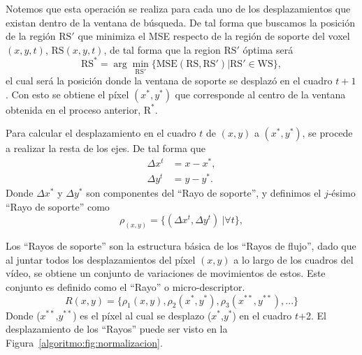 	Notemos que esta operación se realiza para cada uno de los desplazamientos que existan dentro de la ventana de búsqueda. De tal forma que buscamos la posición de la región $\text{RS}'$ que minimiza el MSE respecto de la región de soporte del voxel $(x,y,t)$, $\text{RS}(x,y,t)$, de tal forma que la region $\text{RS}'$ óptima será
	\begin{equation}
		\text{RS}^* = \arg \min_{\text{RS}'}\{\text{MSE}(\text{RS},\text{RS}') | \text{RS}' \in \text{WS} \},
	\end{equation}		
	el cual será la posición donde la ventana de soporte se desplazó en el cuadro $t+1$. Con esto se obtiene el píxel $(x^*,y^*)$ que corresponde al centro de la ventana obtenida en el proceso anterior, $\text{R}^*$.
	
	Para calcular el desplazamiento en el cuadro $t$ de $(x,y)$ a $(x^*,y^*)$, se procede a realizar la resta de los ejes. De tal forma que
	\begin{align}
		\Delta x^{t} &= x-x^*,\\ 
		\Delta y^{t} &= y-y^*.
	\end{align}
		Donde $ \Delta x^*$ y $ \Delta y^*$ son componentes del ``Rayo de soporte'', y definimos el $j$-ésimo ``Rayo de soporte'' como
	\begin{equation}
		\rho_{(x,y)} = \{(\Delta x^{t}, \Delta y^{t})~| \forall t\},
	\end{equation}		
	
	Los ``Rayos de soporte'' son la estructura básica de los ``Rayos de flujo'', dado que al juntar todos los desplazamientos del píxel $(x,y)$ a lo largo de los cuadros del vídeo, se obtiene un conjunto de variaciones de movimientos de estos. Este conjunto es definido como el ``Rayo'' o micro-descriptor.
	\begin{equation}
		R(x,y)	 = \{\rho_1(x,y), \rho_2(x^*,y^*), \rho_3(x^{**},y^{**}), ... \}
	\end{equation}
		Donde ($x^{**}$,$y^{**}$) es el píxel al cual se desplazo ($x^{*}$,$y^{*}$) en el cuadro $t$+2. El desplazamiento de los ``Rayos'' puede ser visto en la Figura~\ref{algoritmo:fig:normalizacion}.
		
		
